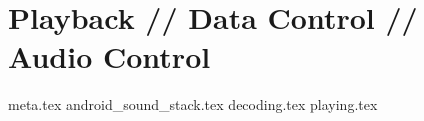 \chapter{Playback // Data Control // Audio Control}
{meta.tex}
{android_sound_stack.tex}
{decoding.tex}
{playing.tex}
